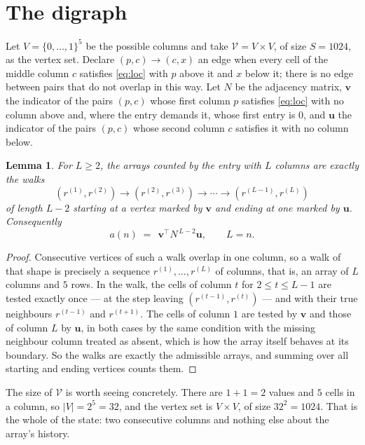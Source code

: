 \documentclass[11pt,a4paper]{article}
\theoremstyle{plain}
\newtheorem{lemma}[theorem]{Lemma}
\theoremstyle{definition}
\begin{document}
\section{The digraph}

Let $V=\{0,\dots,1\}^{5}$ be the possible columns and take
$\mathcal V=V\times V$, of size $S=1024$, as the vertex set. Declare $(p,c)\to(c,x)$ an edge
when every cell of the middle column $c$ satisfies \eqref{eq:loc} with $p$ above it and $x$
below it; there is no edge between pairs that do not overlap in this way. Let $N$ be the
adjacency matrix, $\mathbf{v}$ the indicator of the pairs $(p,c)$ whose first column $p$
satisfies \eqref{eq:loc} with no column above and, where the entry demands it, whose first entry is $0$, and $\mathbf{u}$ the indicator of
the pairs $(p,c)$ whose second column $c$ satisfies it with no column below.

\begin{lemma}\label{lem:walk}
For $L\ge2$, the arrays counted by the entry with $L$ columns are exactly the walks
\[
(r^{(1)},r^{(2)})\to(r^{(2)},r^{(3)})\to\cdots\to(r^{(L-1)},r^{(L)})
\]
of length $L-2$ starting at a vertex marked by $\mathbf{v}$ and ending at one marked by
$\mathbf{u}$. Consequently
\[
a(n)\;=\;\,\mathbf{v}^{\!\top}N^{\,L-2}\mathbf{u},\qquad L=n .
\]
\end{lemma}

\begin{proof}
Consecutive vertices of such a walk overlap in one column, so a walk of that shape is
precisely a sequence $r^{(1)},\dots,r^{(L)}$ of columns, that is, an array of $L$ columns
and $5$ rows. In the walk, the cells of column $t$ for $2\le t\le L-1$ are tested
exactly once --- at the step leaving $(r^{(t-1)},r^{(t)})$ --- and with their true
neighbours $r^{(t-1)}$ and $r^{(t+1)}$. The cells of column $1$ are tested by
$\mathbf{v}$ and those of column $L$ by $\mathbf{u}$, in both cases by the same condition
with the missing neighbour column treated as absent, which is how the array itself behaves at
its boundary. So the walks are exactly the admissible arrays, and summing over all starting
and ending vertices counts them.
\end{proof}


The size of $\mathcal V$ is worth seeing concretely. There are $1+1=2$ values
and $5$ cells in a column, so $|V|=2^{5}=32$, and the vertex set is
$V\times V$, of size $32^2=1024$. That is the whole of the state: two consecutive
columns and nothing else about the array's history.
\end{document}

